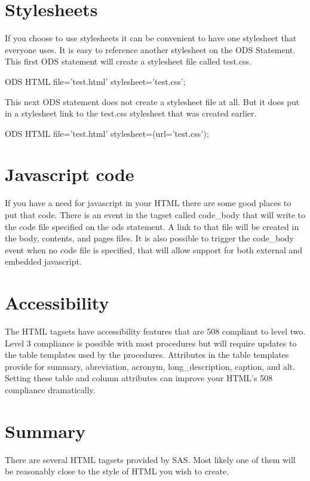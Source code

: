 \section{Stylesheets}
If you choose to use stylesheets it can be convenient to have one stylesheet
that everyone uses.  It is easy to reference another stylesheet on the ODS
Statement.  This first ODS statement will create a stylesheet file called test.css.

\begin{sfvcode}
ODS HTML file='test.html' stylesheet='test.css';
\end{sfvcode}

This next ODS statement does not create a stylesheet file at all.  But it does put 
in a stylesheet link to the test.css stylesheet that was created earlier.

\begin{sfvcode}
ODS HTML file='test.html' stylesheet=(url='test.css');
\end{sfvcode}


\section{Javascript code}
If you have a need for javascript in your HTML there are some good places to put
that code.  There is an event in the tagset called code\_body that will write to
the code file specified on the ods statement.  A link to that file will be created
in the body, contents, and pages files.  It is also possible to trigger the code\_body
event when no code file is specified, that will allow support for both external and 
embedded javascript. 


\section{Accessibility}
The HTML tagsets have accessibility features that are 508 compliant to
level two.  Level 3 compliance is possible with most procedures but 
will require updates to the table templates used by the procedures.
Attributes in the table templates provide for summary, abreviation,
acronym, long\_description, caption, and alt.  Setting these table and
column attributes can improve your HTML's 508 compliance dramatically.  

\section{Summary}
There are several HTML tagsets provided by SAS.  Most likely one of
them will be reasonably close to the style of HTML you wish to create.




